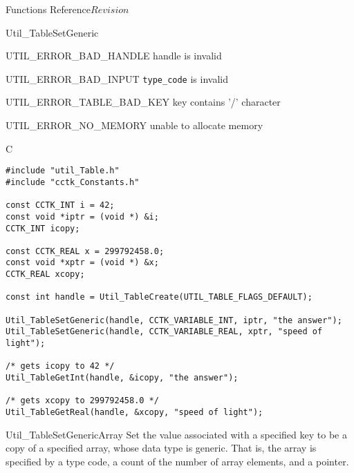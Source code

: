\begin{cactuspart}{ Functions Reference}{}{$Revision$}
\begin{FunctionDescription}{Util\_TableSetGeneric}
\begin{ErrorSection}
\begin{Error}{UTIL\_ERROR\_BAD\_HANDLE}
handle is invalid
\end{Error}
\begin{Error}{UTIL\_ERROR\_BAD\_INPUT}
\verb|type_code| is invalid
\end{Error}
\begin{Error}{UTIL\_ERROR\_TABLE\_BAD\_KEY}
key contains '/' character
\end{Error}
\begin{Error}{UTIL\_ERROR\_NO\_MEMORY}
unable to allocate memory
\end{Error}
\end{ErrorSection}

\begin{ExampleSection}
\begin{Example}{C}
\begin{verbatim}
#include "util_Table.h"
#include "cctk_Constants.h"

const CCTK_INT i = 42;
const void *iptr = (void *) &i;
CCTK_INT icopy;

const CCTK_REAL x = 299792458.0;
const void *xptr = (void *) &x;
CCTK_REAL xcopy;

const int handle = Util_TableCreate(UTIL_TABLE_FLAGS_DEFAULT);

Util_TableSetGeneric(handle, CCTK_VARIABLE_INT, iptr, "the answer");
Util_TableSetGeneric(handle, CCTK_VARIABLE_REAL, xptr, "speed of light");

/* gets icopy to 42 */
Util_TableGetInt(handle, &icopy, "the answer");

/* gets xcopy to 299792458.0 */
Util_TableGetReal(handle, &xcopy, "speed of light");
\end{verbatim}
\end{Example}
\end{ExampleSection}
\end{FunctionDescription}


\begin{FunctionDescription}{Util\_TableSetGenericArray}
\label{Util-TableSetGenericArray}
Set the value associated with a specified key to be a copy of a
specified array, whose data type is generic.  That is, the array
is specified by a  type code, a count of
the number of array elements, and a  pointer.


\end{FunctionDescription}
\end{cactuspart}
